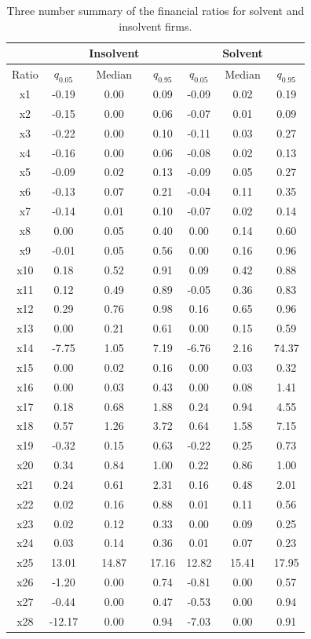 \documentclass{article}
\begin{document}
\begin{table}[t]
\begin{center}
\label{finantialRatios}
\caption{Three number summary of the financial ratios for solvent and insolvent firms.}
\footnotesize
\begin{tabular}{c|ccc|ccc} 
\hline\hline
&&Insolvent&&&Solvent&\\ 
\hline
Ratio & $q_{0.05}$ & Median & $q_{0.95}$ & $q_{0.05}$ & Median & $q_{0.95}$\\
\hline
x1 & -0.19 & 0.00 & 0.09 & -0.09 & 0.02 & 0.19\\
x2 & -0.15 & 0.00 & 0.06 & -0.07 & 0.01 & 0.09\\
x3 & -0.22 & 0.00 & 0.10 & -0.11 & 0.03 & 0.27\\
x4 & -0.16 & 0.00 & 0.06 & -0.08 & 0.02 & 0.13\\
x5 & -0.09 & 0.02 & 0.13 & -0.09 & 0.05 & 0.27\\
x6 & -0.13 & 0.07 & 0.21 & -0.04 & 0.11 & 0.35\\
x7 & -0.14 & 0.01 & 0.10 & -0.07 & 0.02 & 0.14\\
x8 & 0.00 & 0.05 & 0.40 & 0.00 & 0.14 & 0.60\\
x9 & -0.01 & 0.05 & 0.56 & 0.00 & 0.16 & 0.96\\
x10 & 0.18 & 0.52 & 0.91 & 0.09 & 0.42 & 0.88\\
x11 & 0.12 & 0.49 & 0.89 & -0.05 & 0.36 & 0.83\\
x12 & 0.29 & 0.76 & 0.98 & 0.16 & 0.65 & 0.96\\
x13 & 0.00 & 0.21 & 0.61 & 0.00 & 0.15 & 0.59\\
x14 & -7.75 & 1.05 & 7.19 & -6.76 & 2.16 & 74.37\\
x15 & 0.00 & 0.02 & 0.16 & 0.00 & 0.03 & 0.32\\
x16 & 0.00 & 0.03 & 0.43 & 0.00 & 0.08 & 1.41\\
x17 & 0.18 & 0.68 & 1.88 & 0.24 & 0.94 & 4.55\\
x18 & 0.57 & 1.26 & 3.72 & 0.64 & 1.58 & 7.15\\
x19 & -0.32 & 0.15 & 0.63 & -0.22 & 0.25 & 0.73\\
x20 & 0.34 & 0.84 & 1.00 & 0.22 & 0.86 & 1.00\\
x21 & 0.24 & 0.61 & 2.31 & 0.16 & 0.48 & 2.01\\
x22 & 0.02 & 0.16 & 0.88 & 0.01 & 0.11 & 0.56\\
x23 & 0.02 & 0.12 & 0.33 & 0.00 & 0.09 & 0.25\\
x24 & 0.03 & 0.14 & 0.36 & 0.01 & 0.07 & 0.23\\
x25 & 13.01 & 14.87 & 17.16 & 12.82 & 15.41 & 17.95\\
x26 & -1.20 & 0.00 & 0.74 & -0.81 & 0.00 & 0.57\\
x27 & -0.44 & 0.00 & 0.47 & -0.53 & 0.00 & 0.94\\
x28 & -12.17 & 0.00 & 0.94 & -7.03 & 0.00 & 0.91\\
\hline\hline
\end{tabular}
\end{center}
\end{table}
 
\end{document}

